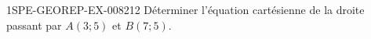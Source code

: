 \begin{exercice}{1SPE-GEOREP-EX-008}{2}{12}
Déterminer l'équation cartésienne de la droite passant par $A(3 ; 5)$ et $B(7 ; 5)$.
\end{exercice}

